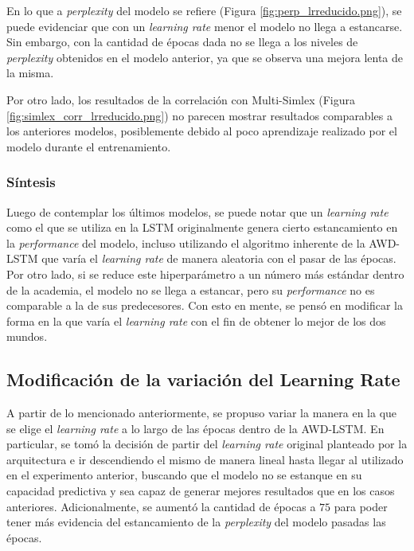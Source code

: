 En lo que a \textit{perplexity} del modelo se refiere (Figura \ref{fig:perp_lrreducido.png}), se puede evidenciar que con un 
\textit{learning rate} menor el modelo no llega a estancarse. Sin embargo, con la cantidad de 
épocas dada no se llega a los niveles de \textit{perplexity} obtenidos en el modelo anterior, 
ya que se observa una mejora lenta de la misma.

Por otro lado, los resultados de la correlación con Multi-Simlex (Figura \ref{fig:simlex_corr_lrreducido.png}) no parecen 
mostrar resultados comparables a los anteriores modelos, posiblemente debido al poco 
aprendizaje realizado por el modelo durante el entrenamiento.

\subsubsection{Síntesis}

Luego de contemplar los últimos modelos, se puede notar que un \textit{learning rate} como el que 
se utiliza en la LSTM originalmente genera cierto estancamiento en la \textit{performance} del 
modelo, incluso utilizando el algoritmo inherente de la AWD-LSTM que varía el 
\textit{learning rate} de manera aleatoria con el pasar de las épocas. Por otro lado, si 
se reduce este hiperparámetro a un número más estándar dentro de la academia, el 
modelo no se llega a estancar, pero su \textit{performance} no es comparable a la de sus 
predecesores. Con esto en mente, se pensó en modificar la forma en la que varía 
el \textit{learning rate} con el fin de obtener lo mejor de los dos mundos.

\subsection{Modificación de la variación del Learning Rate}

A partir de lo mencionado anteriormente, se propuso variar la manera en la que se elige 
el \textit{learning rate} a lo largo de las épocas dentro de la AWD-LSTM. En particular, se tomó 
la decisión de partir del \textit{learning rate} original planteado por la arquitectura e ir 
descendiendo el mismo de manera lineal hasta llegar al utilizado en el experimento 
anterior, buscando que el modelo no se estanque en su capacidad predictiva y sea 
capaz de generar mejores resultados que en los casos anteriores. Adicionalmente, 
se aumentó la cantidad de épocas a $75$ para poder tener más evidencia del estancamiento 
de la \textit{perplexity} del modelo pasadas las épocas.

